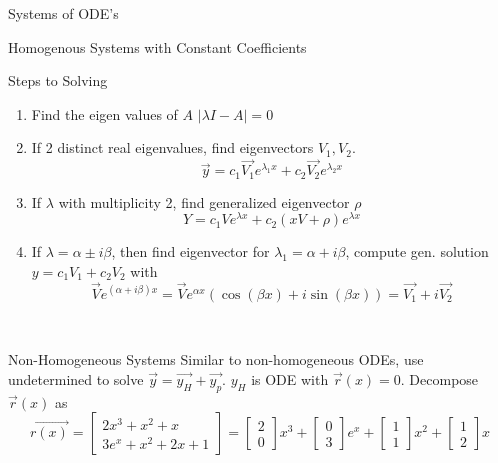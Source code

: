\documentclass{article}
\begin{document}
\begin{multicols*}{3}
\begin{blackbox}{Systems of ODE's}
{\begin{redbox}{Homogenous Systems with Constant Coefficients}
        \begin{brownbox}{Steps to Solving}
            \begin{enumerate}[leftmargin=5pt]
                \item Find the eigen values of $A$ $|\lambda I - A| = 0$
                \item If 2 distinct real eigenvalues, find eigenvectors $V_1,V_2$.\\[-5ex]
                \[\vec{y} = c_1\vec{V_1}e^{\lambda_1x} + c_2\vec{V_2}e^{\lambda_2x}\]
                \item If $\lambda$ with multiplicity 2, find generalized eigenvector $\rho$ \\[-4ex]
                \[Y = c_1Ve^{\lambda x} + c_2(xV + \rho)e^{\lambda x}\]                
                \item If $\lambda = \alpha \pm i\beta$, then find eigenvector for $\lambda_1 = \alpha + i\beta$, compute gen. solution $y = c_1V_1 + c_2V_2$ with
                \[\vec{V}e^{(\alpha + i\beta)x} = \vec{V}e^{\alpha x}(\cos(\beta x) + i\sin (\beta x)) = \vec{V_1} + i\vec{V_2}\]
        \end{enumerate}
        \end{brownbox}
    \end{redbox}\\[-2ex]
    \begin{bluebox}{Non-Homogeneous Systems}
        Similar to non-homogeneous ODEs, use undetermined to solve $\vec{y} = \vec{y_H} + \vec{y_p}$. $y_H$ is ODE with $\vec{r}(x) = 0$. Decompose $\vec{r}(x)$ as 
        {\scriptsize
        \[\vec{r(x)} = \begin{bmatrix}
            2 x^3 + x^2 + x \\
            3e^x + x^2 + 2x + 1
        \end{bmatrix} = \begin{bmatrix}
            2\\
            0
        \end{bmatrix}x^3 + \begin{bmatrix}
            0\\
            3
        \end{bmatrix}e^x + \begin{bmatrix}
            1\\
            1
        \end{bmatrix}x^2 + \begin{bmatrix}
            1\\
            2
        \end{bmatrix}x\]
}
\end{bluebox}}
\end{blackbox}
\end{multicols*}
\end{document}
